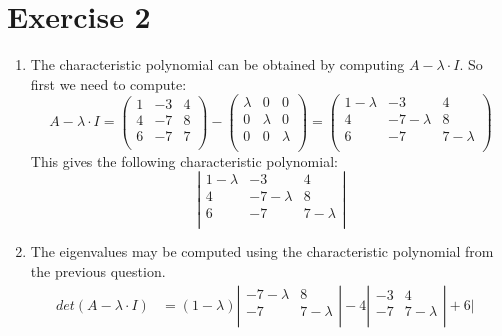 \documentclass[a4paper]{article}
\begin{document}
\section*{Exercise 2}
\begin{enumerate}
  \item The characteristic polynomial can be obtained by computing $A - \lambda \cdot I$. So first we need to compute:
  \[
  A - \lambda \cdot I =
  \left(
  \begin{array}{rrr}
  1 & -3 & 4 \\
  4 & -7 & 8 \\
  6 & -7 & 7 \\
  \end{array}
  \right)
  -
  \left(
  \begin{array}{rrr}
  \lambda & 0 & 0 \\
  0 & \lambda & 0 \\
  0 & 0 & \lambda \\
  \end{array}
  \right)
  =
  \left(
  \begin{array}{rrr}
  1 - \lambda & -3 & 4 \\
  4 & -7 - \lambda & 8 \\
  6 & -7 & 7 - \lambda \\
  \end{array}
  \right)
  \]
  This gives the following characteristic polynomial:
  \[
  \left|
  \begin{array}{rrr}
  1 - \lambda & -3 & 4 \\
  4 & -7 - \lambda & 8 \\
  6 & -7 & 7 - \lambda \\
  \end{array}
  \right|
  \]
  \item The eigenvalues may be computed using the characteristic polynomial from the previous question.
  \begin{align*}
  det(A - \lambda \cdot I) &=
  (1 - \lambda)
  \left|
  \begin{array}{rr}
  -7 - \lambda & 8 \\
  -7 & 7 - \lambda \\
  \end{array}
  \right|
  - 4
  \left|
  \begin{array}{rr}
  -3 & 4 \\
  -7 & 7 - \lambda \\
  \end{array}
  \right|
  + 6
  \left|
  \begin{array}{rr}

\end{array}
\end{align*}
\end{enumerate}
\end{document}
